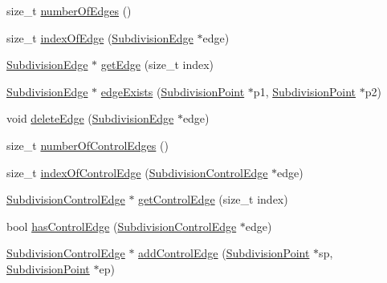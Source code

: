 \begin{DoxyCompactItemize}
size\-\_\-t \hyperlink{classShipCADGeometry_1_1SubdivisionSurface_a9315e6e9d5825ff3e3ba469fe4631e57}{number\-Of\-Edges} ()
\item 
size\-\_\-t \hyperlink{classShipCADGeometry_1_1SubdivisionSurface_aa3d68eacb2fafd9dab6d40c3230ed991}{index\-Of\-Edge} (\hyperlink{classShipCADGeometry_1_1SubdivisionEdge}{Subdivision\-Edge} $\ast$edge)
\item 
\hyperlink{classShipCADGeometry_1_1SubdivisionEdge}{Subdivision\-Edge} $\ast$ \hyperlink{classShipCADGeometry_1_1SubdivisionSurface_a67e69fc54ca38627596efc49b6d82e7f}{get\-Edge} (size\-\_\-t index)
\item 
\hyperlink{classShipCADGeometry_1_1SubdivisionEdge}{Subdivision\-Edge} $\ast$ \hyperlink{classShipCADGeometry_1_1SubdivisionSurface_adfdeabdc19eb55a7ba4ab0b607207300}{edge\-Exists} (\hyperlink{classShipCADGeometry_1_1SubdivisionPoint}{Subdivision\-Point} $\ast$p1, \hyperlink{classShipCADGeometry_1_1SubdivisionPoint}{Subdivision\-Point} $\ast$p2)
\item 
void \hyperlink{classShipCADGeometry_1_1SubdivisionSurface_abb5beb9a6fc413e8d713e18fb39bf2ba}{delete\-Edge} (\hyperlink{classShipCADGeometry_1_1SubdivisionEdge}{Subdivision\-Edge} $\ast$edge)
\item 
size\-\_\-t \hyperlink{classShipCADGeometry_1_1SubdivisionSurface_aa3647f3aec2f2c40ba764540cb29e7a2}{number\-Of\-Control\-Edges} ()
\item 
size\-\_\-t \hyperlink{classShipCADGeometry_1_1SubdivisionSurface_ae2f4e931f0134f8637e0aa769dba1d32}{index\-Of\-Control\-Edge} (\hyperlink{classShipCADGeometry_1_1SubdivisionControlEdge}{Subdivision\-Control\-Edge} $\ast$edge)
\item 
\hyperlink{classShipCADGeometry_1_1SubdivisionControlEdge}{Subdivision\-Control\-Edge} $\ast$ \hyperlink{classShipCADGeometry_1_1SubdivisionSurface_ac7d6762dc83f1f114c1d7f4e67d8f8eb}{get\-Control\-Edge} (size\-\_\-t index)
\item 
bool \hyperlink{classShipCADGeometry_1_1SubdivisionSurface_a9856bef9e5b2de9be4a3118fa80d0f16}{has\-Control\-Edge} (\hyperlink{classShipCADGeometry_1_1SubdivisionControlEdge}{Subdivision\-Control\-Edge} $\ast$edge)
\item 
\hyperlink{classShipCADGeometry_1_1SubdivisionControlEdge}{Subdivision\-Control\-Edge} $\ast$ \hyperlink{classShipCADGeometry_1_1SubdivisionSurface_a976358235d20a0fdc83248948bb9cf48}{add\-Control\-Edge} (\hyperlink{classShipCADGeometry_1_1SubdivisionPoint}{Subdivision\-Point} $\ast$sp, \hyperlink{classShipCADGeometry_1_1SubdivisionPoint}{Subdivision\-Point} $\ast$ep)

\end{DoxyCompactItemize}
